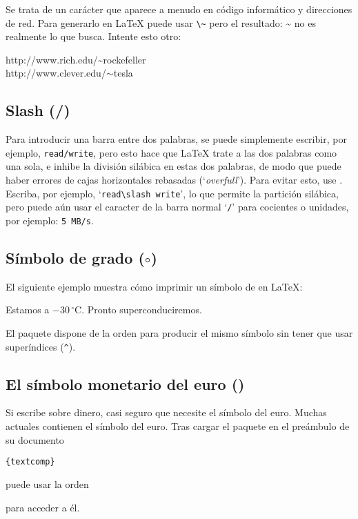 Se trata de un carácter que aparece a menudo en código informático y direcciones de red.  Para generarlo en \LaTeX{} puede usar \verb|\~| pero el resultado: \~{} no es realmente lo que busca.  Intente esto otro:

\begin{example}
http://www.rich.edu/\~{}rockefeller \\
http://www.clever.edu/$\sim$tesla
\end{example}  
 
\subsection{Slash (/)}
Para introducir una barra entre dos palabras, se puede simplemente escribir, por ejemplo, \texttt{read/write}, pero esto hace que \LaTeX{} trate a las dos palabras como una sola, e inhibe la división silábica 
en estas dos palabras, de modo que puede haber errores de cajas horizontales rebasadas (`\emph{overfull}').  
Para evitar esto, use .  
Escriba, por ejemplo, `\verb|read\slash write|', lo que permite la partición silábica, pero puede aún usar el caracter de la barra normal `\texttt{/}' para cocientes o unidades, por ejemplo: \texttt{5 MB/s}.

\subsection{Símbolo de grado \texorpdfstring{($\circ$)}{}}

El siguiente ejemplo muestra cómo imprimir un símbolo de  en \LaTeX{}:

\begin{example}
Estamos a 
$-30\,^{\circ}\mathrm{C}$.
Pronto superconduciremos.
\end{example}

El paquete  dispone de la orden  para producir el mismo símbolo sin tener que usar superíndices (\verb|^|).

\subsection{El símbolo monetario del euro \texorpdfstring{(\officialeuro)}{}}

Si escribe sobre dinero, casi seguro que necesite el símbolo del euro.  Muchas \fontsnomo{} actuales contienen el símbolo del euro. Tras cargar el paquete  en el preámbulo de su documento
\begin{lscommand}
\verb|{textcomp}| 
\end{lscommand}
puede usar la orden
\begin{lscommand}
\end{lscommand}
para acceder a él.

